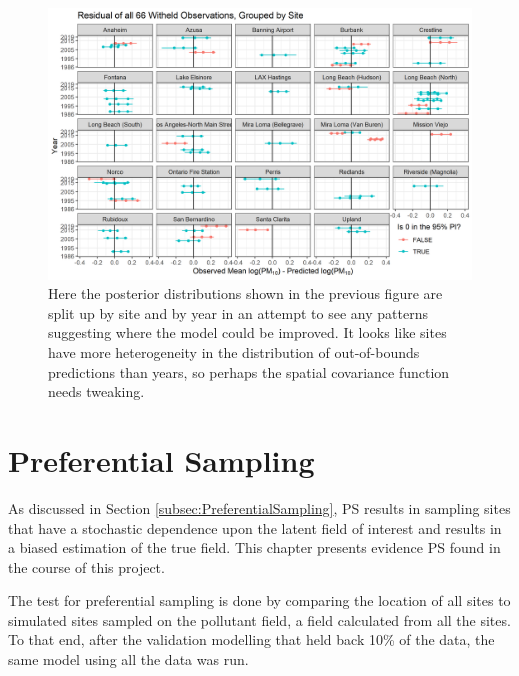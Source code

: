 \documentclass{article}
\begin{document}
\begin{figure}[ht]
	\centering
	\includegraphics[width = \textwidth]{Figures/Validation/validate_delta_site.png}
	\caption{Here the posterior distributions shown in the previous figure are split up by site and by year in an attempt to see any patterns suggesting where the model could be improved.  It looks like sites have more heterogeneity in the distribution of out-of-bounds predictions than years, so perhaps the spatial covariance function needs tweaking.}
	\label{fig:validate_delta_site}
\end{figure}


%
\section{Preferential Sampling}
\label{sec:prefsamp}

As discussed in Section \ref{subsec:PreferentialSampling}, \ac{PS} results in sampling sites that have a stochastic dependence upon the latent field of interest and results in a biased estimation of the true field.  This chapter presents evidence  \ac{PS} found in the course of this project.

The test for preferential sampling is done by comparing the location of all sites to simulated sites sampled on the pollutant field, a field calculated from all the sites.  To that end, after the validation modelling that held back 10\% of the data, the same model using all the data was run.
\end{document}
